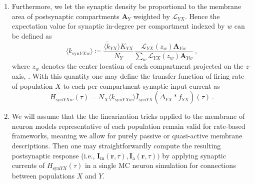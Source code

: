 \begin{enumerate}
\item Furthermore, we let the synaptic density be proportional to the membrane area of postsynaptic compartments $\mathbf{A}_Y$ weighted by $\mathcal{L}_{YX}$.
Hence the expectation value for synaptic in-degree per compartment indexed by $w$ can be defined as
\begin{equation}
\langle k_{\text{syn}YXw} \rangle \coloneq \frac{\langle \widetilde{k}_{YX} \rangle K_{YX}}{N_Y} \frac{ \mathcal{L}_{YX}(z_w) \mathbf{A}_{Yw}}{\sum_w \mathcal{L}_{YX}(z_w) \mathbf{A}_{Yw}} ~,
\end{equation}
where $z_w$ denotes the center location of each compartment projected on the $z$-axis, 
.
With this quantity one may define the transfer function  of firing rate of population $X$ to each per-compartment synaptic input current as
\begin{equation}
H_{\text{syn}YXw}(\tau) = N_X \langle k_{\text{syn}YXw} \rangle \overline{I}_{\text{syn}YX} \left( \widetilde{\Delta}_{YX} \ast f_{YX}\right)(\tau) ~.
\end{equation}

\item We will assume that the the linearization tricks applied to the membrane of neuron models representative of each population remain valid for rate-based frameworks,
meaning we allow for purely passive or quasi-active membrane descriptions.
Then one may straightforwardly compute the resulting postsynaptic response
(i.e., $\mathbf{I}_\text{m}(\mathbf{r}, \tau),{}\mathbf{I}_\text{a}(\mathbf{r}, \tau))$
by applying synaptic currents of $H_{\text{syn}YX}(\tau)$ in a single MC neuron simulation for connections between populations $X$ and $Y$.


\end{enumerate}
